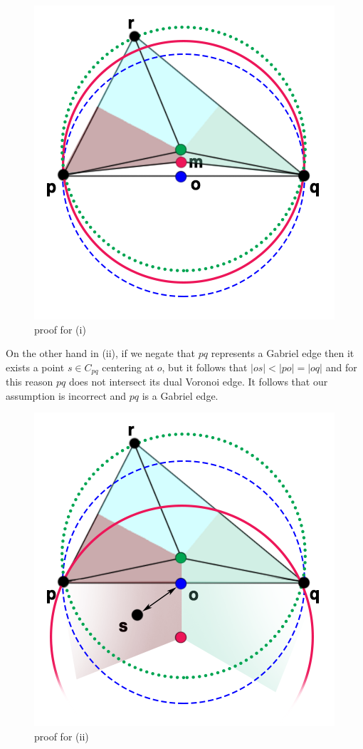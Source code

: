 \documentclass[12pt]{article}
\begin{document}
\begin{enumerate}[label=\alph*)]
	\begin{figure}[H]
		\centering
		\includegraphics[scale=0.4]{img/1.png}
		\caption{proof for (i)} \label{fig:1a}
	\end{figure}
	
	On the other hand in (ii), if we negate that $pq$ represents a Gabriel edge then it exists a point $s \in C_{pq}$ centering at $o$, but it follows that $|os| < |po| = |oq|$ and for this reason $pq$ does not intersect its dual Voronoi edge. It follows that our assumption is incorrect and $pq$ is a Gabriel edge.
	
	\begin{figure}[H]
		\centering
		\includegraphics[scale=0.4]{img/2.png}
		\caption{proof for (ii)} \label{fig:1a}
	\end{figure}
	


\end{enumerate}
\end{document}
